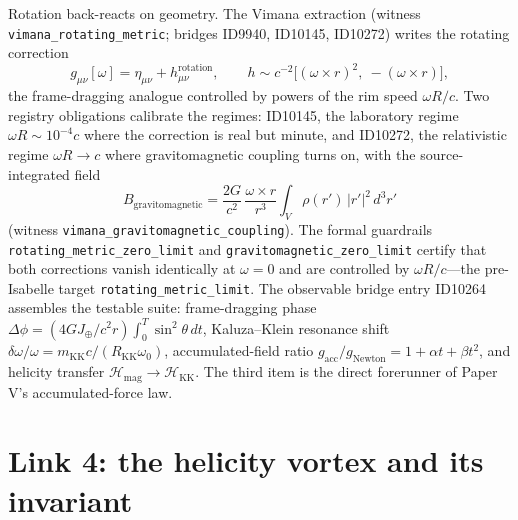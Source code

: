 \documentclass[11pt]{article}
\theoremstyle{remark}
\begin{document}
Rotation back-reacts on geometry. The Vimana extraction (witness \texttt{vimana\_rotating\_metric}; bridges ID9940, ID10145, ID10272) writes the rotating correction
\begin{equation}
g_{\mu\nu}[\omega] = \eta_{\mu\nu} + h^{\mathrm{rotation}}_{\mu\nu}, \qquad
h \sim c^{-2}\big[ (\omega \times r)^2,\ -(\omega \times r) \big],
\label{eq:rotmetric}
\end{equation}
the frame-dragging analogue controlled by powers of the rim speed $\omega R / c$. Two registry obligations calibrate the regimes: ID10145, the laboratory regime $\omega R \sim 10^{-4} c$ where the correction is real but minute, and ID10272, the relativistic regime $\omega R \to c$ where gravitomagnetic coupling turns on, with the source-integrated field
\begin{equation}
B_{\mathrm{gravitomagnetic}} = \frac{2G}{c^2}\, \frac{\omega \times r}{r^3} \int_V \rho(r')\, |r'|^2\, d^3r'
\end{equation}
(witness \texttt{vimana\_gravitomagnetic\_coupling}). The formal guardrails \texttt{rotating\_metric\_zero\_limit} and \texttt{gravitomagnetic\_zero\_limit} certify that both corrections vanish identically at $\omega = 0$ and are controlled by $\omega R/c$---the pre-Isabelle target \texttt{rotating\_metric\_limit}. The observable bridge entry ID10264 assembles the testable suite: frame-dragging phase $\Delta\phi = (4GJ_\oplus / c^2 r) \int_0^T \sin^2\theta\, dt$, Kaluza--Klein resonance shift $\delta\omega/\omega = m_{\mathrm{KK}} c / (R_{\mathrm{KK}}\omega_0)$, accumulated-field ratio $g_{\mathrm{acc}}/g_{\mathrm{Newton}} = 1 + \alpha t + \beta t^2$, and helicity transfer $\mathcal{H}_{\mathrm{mag}} \to \mathcal{H}_{\mathrm{KK}}$. The third item is the direct forerunner of Paper V's accumulated-force law.

\section{Link 4: the helicity vortex and its invariant}
\label{sec:helicity}
\end{document}
